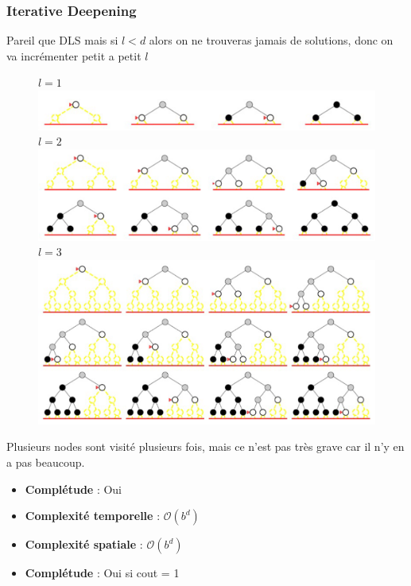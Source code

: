 		\subsubsection{Iterative Deepening}		
		  Pareil que DLS mais si $l < d$ alors on ne trouveras jamais de solutions, donc on va incrémenter petit a petit $l$
			\begin{figure}[htp]
				\centering
				$l = 1$
				\includegraphics[width=\textwidth]{img/DLS1.png}
				$l = 2$
				\includegraphics[width=\textwidth]{img/DLS2.png}
				$l = 3$
				\includegraphics[width=\textwidth]{img/DLS3.png}

			\end{figure}
			
		Plusieurs nodes sont visité plusieurs fois, mais ce n'est pas très grave car il n'y en a pas beaucoup.
		
		\begin{itemize}
			\item \textbf{Complétude} : Oui
			\item \textbf{Complexité temporelle} : $\mathcal{O}(b^d)$
			\item \textbf{Complexité spatiale} : $\mathcal{O}(b^d)$
			\item \textbf{Complétude} : Oui si cout = 1
		\end{itemize}
		
